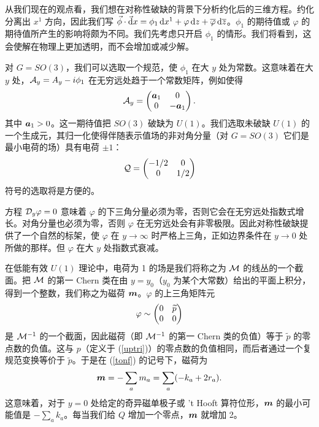 从我们现在的观点看，我们想在对称性破缺的背景下分析约化后的三维方程。约化分离出 $x^1$ 方向，因此我们写  $\vec\phi\cdot \vec \d x=\phi_1\,\d x^1+\varphi\, \d z +\bar \varphi\,\d \bar z$。$\phi_1$ 的期待值或 $\varphi$ 的期待值所产生的影响将颇为不同。我们先考虑只开启 $\phi_1$ 的情形。我们将看到，这会使解在物理上更加透明，而不会增加或减少解。

对 $G=SO(3)$，我们可以选取一个规范，使 $\phi_1$ 在大 $y$ 处为常数。这意味着在大 $y$ 处，$\A_y=A_y-i\phi_1$ 在无穷远处趋于一个常数矩阵，例如使得
\begin{equation}\label{gauga}
\A_y = \begin{pmatrix} \ca_1 & 0 \cr 0 & -\ca_1\end{pmatrix}.
\end{equation}
其中 $\ca_1>0$。这一期待值把 $SO(3)$ 破缺为 $U(1)$。我们选取未破缺 $U(1)$ 的一个生成元，其归一化使得伴随表示值场的非对角分量（对 $G=SO(3)$ 它们是最小电荷的场）具有电荷 $\pm 1$：
\begin{equation}\mathcal Q=\begin{pmatrix}-1/2 & 0 \cr 0 & 1/2\end{pmatrix}\end{equation}
符号的选取将是方便的。

方程 $\D_y\varphi=0$ 意味着 $\varphi$ 的下三角分量必须为零，否则它会在无穷远处指数式增长。对角分量也必须为零，否则 $\varphi$ 在无穷远处会有非零极限。因此对称性破缺提供了一个自然的标架，使 $\varphi$ 在 $y\to\infty$ 时严格上三角，正如边界条件在 $y\to 0$ 处所做的那样。但 $\varphi$ 在大 $y$ 处指数式衰减。

在低能有效 $U(1)$ 理论中，电荷为 1 的场是我们将称之为 $\M$ 的线丛的一个截面。把 $\M$ 的第一 Chern 类在由 $y=y_0$（$y_0$ 为某个大常数）给出的平面上积分，得到一个整数，我们称之为磁荷 $\m$。$\varphi$ 的上三角矩阵元
\begin{equation}\label{tomigo}\varphi\sim \begin{pmatrix} 0 & \tilde p \cr 0 & 0 \end{pmatrix}
\end{equation}
是 $\M^{-1}$ 的一个截面，因此磁荷（即 $\M^{-1}$ 的第一 Chern 类的负值）等于 $\tilde p$ 的零点数的负值。这与 $p$（定义于 (\ref{uptri})）的零点数的负值相同，而后者通过一个复规范变换等价于 $\tilde p$。于是在 (\ref{tonf}) 的记号下，磁荷为
\begin{equation}\label{magch} \m = -\sum_a m_a=\sum_a(-k_a+2r_a).\end{equation}
这意味着，对于 $y=0$ 处给定的奇异磁单极子或 't Hooft 算符位形，$\m$ 的最小可能值是 $-\sum_ak_a$。每当我们给 $Q$ 增加一个零点，$\m$ 就增加 2。

